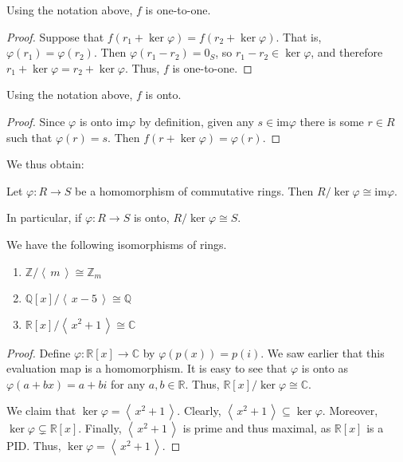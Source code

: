 \documentclass[english,course]{lecture}
\newcommand{\ideal}[1]{\left\langle\, #1 \,\right\rangle}
\def\p{\varphi}
\def\im{\text{im}}
\theoremstyle{plain}
\def\C{{\mathbb C}}
\def\Z{{\mathbb Z}}
\def\Q{{\mathbb Q}}
\def\R{{\mathbb R}}
\def\presnotes{}
\begin{document}

\begin{lemma}
	Using the notation above, $f$ is one-to-one.
\end{lemma}

\begin{proof}
Suppose that $f(r_1 + \ker\p) = f(r_2 + \ker\p)$. 
	That is, $\p(r_1) = \p(r_2)$.
	Then $\p(r_1 - r_2) = 0_S$, so $r_1 -r_2 \in \ker\p$, and therefore $r_1 + \ker\p = r_2 + \ker \p$.
	Thus, $f$ is one-to-one.
\end{proof}



\begin{lemma}
	Using the notation above, $f$ is onto.
\end{lemma}

\begin{proof}
Since $\p$ is onto $\im \p$ by definition, given any $s\in \im \p$ there is some $r\in R$ such that $\p(r) = s$.
	Then $f(r+\ker\p) = \p(r)$.
\end{proof}


We thus obtain:

\begin{unnumberedtheorem}
	Let $\p : R\to S$ be a  homomorphism of commutative rings.
	Then $R/\ker \p \cong \im \p$.
	
	In particular, if $\p : R\to S$ is onto, $R/\ker \p \cong S$.
\end{unnumberedtheorem}




\begin{theorem}
	We have the following isomorphisms of rings.
	\begin{enumerate}
		\item $\Z/\ideal{m} \cong \Z_m$
		\item $\Q[x]/\ideal{x-5} \cong \Q$
		\item $\R[x]/\ideal{x^2+1} \cong \C$
	\end{enumerate}
\end{theorem}

\begin{proof}
	Define $\p: \R[x] \to \C$ by $\p(p(x)) = p(i)$.
	We saw earlier that this evaluation map is a homomorphism.
	It is easy to see that $\p$ is onto as $\p(a+bx) = a+bi$ for any $a,b\in \R$.
	Thus, $\R[x]/\ker\p \cong \C$.
	
	We claim that $\ker\p = \ideal{x^2+1}$.
	Clearly, $\ideal{x^2+1} \subseteq \ker\p$.
	Moreover, $\ker\p \subsetneq \R[x]$.
	Finally, $\ideal{x^2+1}$ is prime and thus maximal, as $\R[x]$ is a PID.
	Thus, $\ker\p = \ideal{x^2+1}$.
\end{proof}
\end{document}
